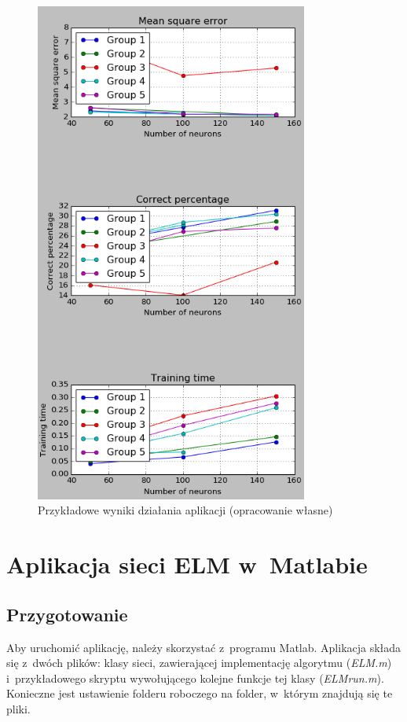 \documentclass[pl]{minipw} %
\begin{document}
\begin{figure}[H]
\centering
\includegraphics[width=0.8\textwidth]{instrukcja_python_end.png}
\caption[Przykładowe wyniki działania aplikacji]{Przykładowe wyniki działania aplikacji (opracowanie własne)}
\label{instrukcja_python_end}
\end{figure}
\clearpage
\section*{Aplikacja sieci ELM w~Matlabie}
\subsection*{Przygotowanie}
Aby uruchomić aplikację, należy skorzystać z~programu Matlab.
Aplikacja składa się z~dwóch plików: klasy sieci, zawierającej implementację algorytmu (\textit{ELM.m}) i~przykładowego skryptu wywołującego kolejne funkcje tej klasy (\textit{ELM\textunderscore run.m}).
Konieczne jest ustawienie folderu roboczego na folder, w~którym znajdują się te pliki.
\end{document}
